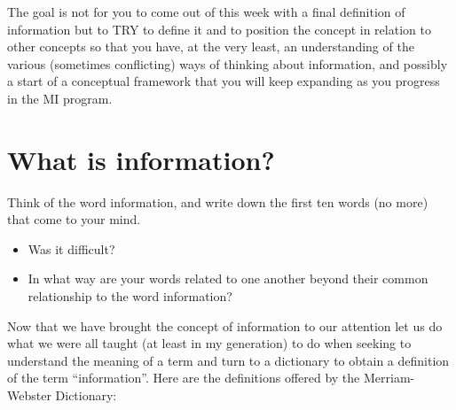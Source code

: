 \documentclass[
  letterpaper,
  DIV=11,
  numbers=noendperiod]{scrreprt}
\begin{document}
\begin{tcolorbox}[enhanced jigsaw, arc=.35mm, bottomrule=.15mm, bottomtitle=1mm, breakable, colback=white, colbacktitle=quarto-callout-note-color!10!white, colframe=quarto-callout-note-color-frame, coltitle=black, left=2mm, leftrule=.75mm, opacityback=0, opacitybacktitle=0.6, rightrule=.15mm, title=\textcolor{quarto-callout-note-color}{\faInfo}\hspace{0.5em}{Clarification}, titlerule=0mm, toprule=.15mm, toptitle=1mm]

The goal is not for you to come out of this week with a final definition
of information but to TRY to define it and to position the concept in
relation to other concepts so that you have, at the very least, an
understanding of the various (sometimes conflicting) ways of thinking
about information, and possibly a start of a conceptual framework that
you will keep expanding as you progress in the MI program.

\end{tcolorbox}

\section{What is information?}\label{what-is-information-1}

\begin{tcolorbox}[enhanced jigsaw, arc=.35mm, bottomrule=.15mm, bottomtitle=1mm, breakable, colback=white, colbacktitle=quarto-callout-tip-color!10!white, colframe=quarto-callout-tip-color-frame, coltitle=black, left=2mm, leftrule=.75mm, opacityback=0, opacitybacktitle=0.6, rightrule=.15mm, title=\textcolor{quarto-callout-tip-color}{\faLightbulb}\hspace{0.5em}{Tip}, titlerule=0mm, toprule=.15mm, toptitle=1mm]

Think of the word information, and write down the first ten words (no
more) that come to your mind.

\begin{itemize}
\item
  Was it difficult?
\item
  In what way are your words related to one another beyond their common
  relationship to the word information?
\end{itemize}

\end{tcolorbox}

Now that we have brought the concept of information to our attention let
us do what we were all taught (at least in my generation) to do when
seeking to understand the meaning of a term and turn to a dictionary to
obtain a definition of the term ``information''. Here are the
definitions offered by the Merriam-Webster Dictionary:
\end{document}
